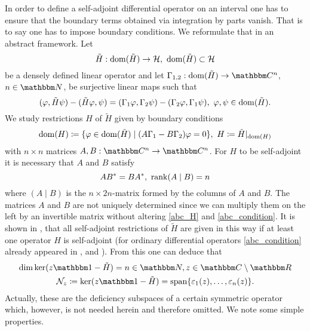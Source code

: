 In order to define a self-adjoint differential operator on an interval one has to ensure
that the boundary terms obtained via integration by parts vanish. That is to say one has to impose
boundary conditions. We reformulate that in an abstract framework. Let 
\begin{equation}\label{abc_H_tilde}
  \tilde H:\operatorname{dom}(\tilde H)\to{\mathcal H},\   \operatorname{dom}(\tilde H)\subset{\mathcal H}
\end{equation}
be a densely defined linear operator and let $\Gamma_{1,2}:\dom(\tilde H)\to\C^n$, $n\in\N$, be surjective linear maps
such that
\begin{equation*}
  (\varphi,\tilde H\psi) - (\tilde H\varphi,\psi)
    = (\Gamma_1\varphi,\Gamma_2\psi) - (\Gamma_2\varphi,\Gamma_1\psi),\ \varphi,\psi\in\dom(\tilde H) .
\end{equation*}
We study restrictions $H$ of $\tilde H$ given by boundary conditions
\begin{equation}\label{abc_H}
  \operatorname{dom}(H) \coloneqq \{\varphi\in\operatorname{dom}(\tilde H)\mid (A\Gamma_1-B\Gamma_2)\varphi=0 \},\
    H \coloneqq \tilde H|_{\operatorname{dom}(H)}
\end{equation}
with $n\times n$ matrices $A,B:\C^n\to\C^n$. 
For $H$ to be self-adjoint it is necessary that $A$ and $B$ satisfy
\begin{equation}\label{abc_condition}
  AB^* = BA^*,\ \operatorname{rank}(A\mid B)=n
\end{equation}
where $(A\mid B)$ is the $n\times 2n$-matrix formed by the columns of $A$ and $B$.
The matrices $A$ and $B$ are not uniquely determined since we can multiply them on the left by an invertible matrix
without altering \eqref{abc_H} and \eqref{abc_condition}.
It is shown in \cite{BehrndtLanger2010}, that all self-adjoint restrictions of $\tilde H$ are given in this way
if at least one operator $H$ is self-adjoint (for ordinary differential operators \eqref{abc_condition} already
appeared in \cite[9.4]{Ince1926}, and \cite[II.2.2]{Hellwig1964}).
From this one can deduce that
\begin{gather}\label{abc_deficiency_index}
  \dim\ker(z\id-\tilde H) = n\in\N, z\in\C\setminus\R \\
  \label{abc_deficiency_subspace}
  \mathcal{N}_z \coloneqq \ker(z\id-\tilde H) = \mathspan\{ \varepsilon_1(z),\ldots, \varepsilon_n(z)\} .
\end{gather}
Actually, these are the deficiency subspaces of a certain symmetric operator which, however, is not
needed herein and therefore omitted. We note some simple properties.

